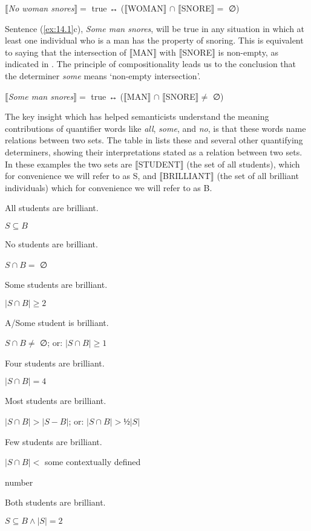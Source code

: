 \ea \label{ex:14.3}
{}$\llbracket$\textit{No woman snores}$\rrbracket =$ true ↔  ($\llbracket$WOMAN$\rrbracket$  ${\cap}$ $\llbracket$SNORE$\rrbracket =$ ∅)
\z


Sentence (\ref{ex:14.1}c), \textit{Some man snores}, will be true in any situation in which at least one individual who is a man has the property of snoring. This is equivalent to saying that the intersection of $\llbracket$MAN$\rrbracket$  with $\llbracket$SNORE$\rrbracket$  is non-empty, as indicated in . The principle of compositionality leads us to the conclusion that the determiner \textit{some} means ‘non-empty intersection’.


\ea \label{ex:14.4}
{}$\llbracket$\textit{Some man snores}$\rrbracket =$ true ↔  ($\llbracket$MAN$\rrbracket$  ${\cap}$ $\llbracket$SNORE$\rrbracket \neq$ ∅)
\z


The key insight which has helped semanticists understand the meaning contributions of quantifier words like \textit{all}, \textit{some}, and \textit{no}, is that these words name relations between two sets. The table in  lists these and several other quantifying determiners, showing their interpretations stated as a relation between two sets. In these examples the two sets are $\llbracket$STUDENT$\rrbracket$  (the set of all students), which for convenience we will refer to as S, and $\llbracket$BRILLIANT$\rrbracket$  (the set of all brilliant individuals) which for convenience we will refer to as B.

\ea \label{ex:14.5}
\ea  \parbox{4.5cm}{All students are brilliant.}\parbox{6cm}{$S \subseteq B$}
\ex   \parbox{4.5cm}{No students are brilliant.}\parbox{6cm}{$S  \cap {B} = $ ∅}
\ex \parbox{4.5cm}{Some students are brilliant.}\parbox{6cm}{$|S \cap {B}{|} {\geq} 2$}
\ex \parbox{4.5cm}{A/Some student is brilliant.}\parbox{6cm}{$S  \cap B \neq $ ∅; or:  $|S \cap B| \geq 1$}
\ex \parbox{4.5cm}{Four students are brilliant.}\parbox{6cm}{$|S \cap B | = 4$\footnotemark{}}
\ex \parbox{4.5cm}{Most students are brilliant.}\parbox{6cm}{$|S \cap B | > |S - B|$; or: $|S \cap B| > ½|S|$}
\ex  \parbox{4.5cm}{Few students are brilliant.}\parbox[t]{5.7cm}{$|S \cap B | <$ some contextually defined\\\rule{0pt}{0pt}\hfill number}
\ex \parbox{4.5cm}{Both students are brilliant.}\parbox{6cm}{$S  \subseteq B  \wedge |S| = 2$}
\z \z
{}

